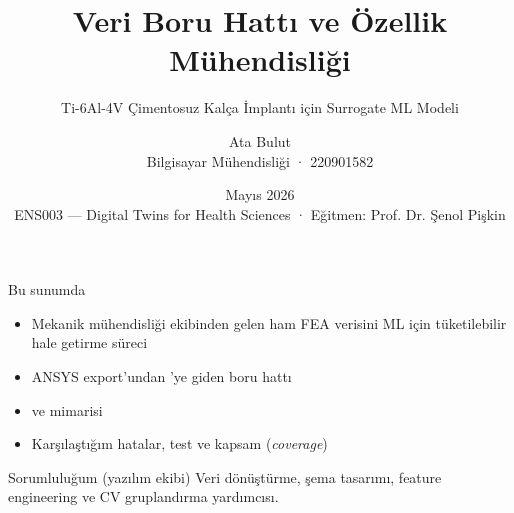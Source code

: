 

\newcommand{\courseHeader}{ENS003 --- Digital Twins for Health Sciences}
\newcommand{\courseSubheader}{İstinye Üniversitesi · Müh. ve Doğa Bilimleri Fakültesi}
\newcommand{\instructor}{Eğitmen: Prof. Dr. Şenol Pişkin}
\newcommand{\projectTitle}{Ti-6Al-4V Çimentosuz Kalça İmplantı için Surrogate ML Modeli}

\title{Veri Boru Hattı ve Özellik Mühendisliği}
\subtitle{\projectTitle}
\author{Ata Bulut \\ \small Bilgisayar Mühendisliği · 220901582}
\date{Mayıs 2026 \\ \scriptsize \courseHeader{} · \instructor}



\maketitle

\begin{frame}{Bu sunumda}
  \begin{itemize}
    \item Mekanik mühendisliği ekibinden gelen ham FEA verisini ML için
          tüketilebilir hale getirme süreci
    \item ANSYS export'undan 'ye giden boru hattı
    \item {} ve  mimarisi
    \item Karşılaştığım hatalar, test ve kapsam (\textit{coverage})
  \end{itemize}
  \vspace{0.4cm}
  \begin{block}{Sorumluluğum (yazılım ekibi)}
    Veri dönüştürme, şema tasarımı, feature engineering ve CV
    gruplandırma yardımcısı.
  \end{block}
\end{frame}


